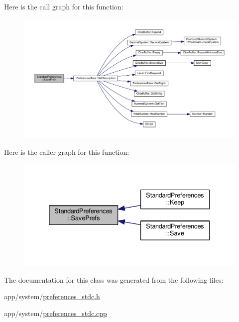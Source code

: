 Here is the call graph for this function\+:
\nopagebreak
\begin{figure}[H]
\begin{center}
\leavevmode
\includegraphics[width=350pt]{d5/dc4/classStandardPreferences_af4d99d40f18776348f76fc0b9f5cdda4_cgraph}
\end{center}
\end{figure}




Here is the caller graph for this function\+:
\nopagebreak
\begin{figure}[H]
\begin{center}
\leavevmode
\includegraphics[width=332pt]{d5/dc4/classStandardPreferences_af4d99d40f18776348f76fc0b9f5cdda4_icgraph}
\end{center}
\end{figure}




The documentation for this class was generated from the following files\+:\begin{DoxyCompactItemize}
\item 
app/system/\hyperlink{preferences__stdc_8h}{preferences\+\_\+stdc.\+h}\item 
app/system/\hyperlink{preferences__stdc_8cpp}{preferences\+\_\+stdc.\+cpp}\end{DoxyCompactItemize}

